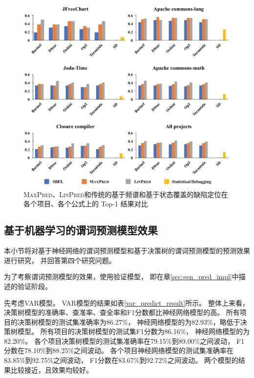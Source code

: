\begin{figure}[htbp] 
\centering 
\includegraphics[width=15cm]{figure/all-figure-method-level} 
\caption{\textsc{MaxPred}、\textsc{LinPred}和传统的基于频谱和基于状态覆盖的缺陷定位在各个项目、各个公式上的 Top-1 结果对比} 
\label{fig:all-figure-method-level}
\end{figure}

\subsection{基于机器学习的谓词预测模型效果}

本小节将对基于神经网络的谓词预测模型和基于决策树的谓词预测模型的预测效果进行研究，
并回答第四个研究问题。

为了考察谓词预测模型的效果，使用验证模型，
即在章\ref{sec:gen_pred_impl}中描述的验证阶段。

先考虑VAR模型。
VAR模型的结果如表\ref{var_predict_result}所示。
整体上来看，决策树模型的准确率、查准率、查全率和F1分数都比神经网络模型的高。
所有项目的决策树模型的测试集准确率为86.27\%，
神经网络模型的为82.93\%，略低于决策树模型。
所有项目的决策树模型的测试集F1分数为86.16\%，
神经网络模型的为82.20\%。
各个项目决策树模型的测试集准确率在79.15\%到89.00\%之间波动，
F1分数在78.10\%到88.25\%之间波动。
各个项目神经网络模型的测试集准确率在83.85\%到92.75\%之间波动，
F1分数在83.67\%到92.72\%之间波动。
两个模型的结果比较接近，且效果均较好。

